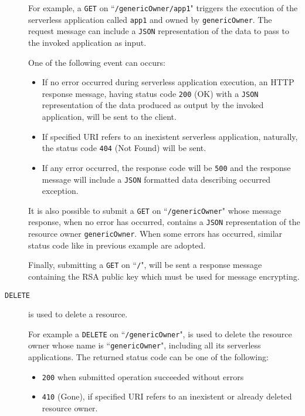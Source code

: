 \documentclass[12pt,a4paper]{report}
\newcommand{\QuoteIntro}{``}
\begin{document}
\begin{description}
	For example, a \texttt{GET} on \QuoteIntro\texttt{/genericOwner/app1}" triggers the execution of the serverless application called \texttt{app1} and owned by \texttt{genericOwner}. The request message can include a \texttt{JSON} representation of the data to pass to the invoked application as input.
	
	One of the following event can occurs:
	\begin{itemize}
		\item If no error occurred during serverless application execution, an HTTP response message, having status code \texttt{200} (OK) with a \texttt{JSON} representation of the data produced as output by the invoked application, will be sent to the client. 
		
		\item If specified URI refers to an inexistent serverless application, naturally, the status code \texttt{404} (Not Found) will be sent.
		
		\item If any error occurred, the response code will be \texttt{500} and the response message will include a \texttt{JSON} formatted data describing occurred exception.
	\end{itemize}

	It is also possible to submit a \texttt{GET} on \QuoteIntro\texttt{/genericOwner}" whose message response, when no error has occurred, contains a \texttt{JSON} representation of the resource owner \texttt{genericOwner}. When some errors has occurred, similar status code like in previous example are adopted.
	
	Finally, submitting a \texttt{GET} on \QuoteIntro\texttt{/}", will be sent a response message containing the RSA public key which must be used for message encrypting.
	
	\item[\texttt{DELETE}] is used to delete a resource. 
	
	For example a \texttt{DELETE} on \QuoteIntro\texttt{/genericOwner}", is used to delete the resource owner whose name is \QuoteIntro\texttt{genericOwner}", including all its serverless applications. The returned status code can be one of the following:
	
	\begin{itemize}
		\item \texttt{200} when submitted operation succeeded without errors
		
		\item \texttt{410} (Gone), if specified URI refers to an inexistent or already deleted resource owner.
		

\end{itemize}
\end{description}
\end{document}
